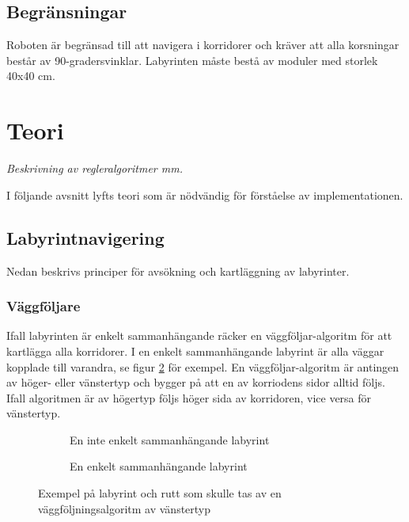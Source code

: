 \documentclass[11pt]{article}
\begin{document}
\begin{flushleft}
\subsection{Begränsningar}
Roboten är begränsad till att navigera i korridorer och kräver att alla korsningar består av 90-gradersvinklar. Labyrinten måste bestå av moduler med storlek 40x40 cm.

\pagebreak

\section{Teori}
\textit{Beskrivning av regleralgoritmer mm.}

I följande avsnitt lyfts teori som är nödvändig för förståelse av implementationen.

\subsection{Labyrintnavigering}
Nedan beskrivs principer för avsökning och kartläggning av labyrinter.

\subsubsection{Väggföljare}
Ifall labyrinten är enkelt sammanhängande räcker en väggföljar-algoritm för att kartlägga alla korridorer. I en enkelt sammanhängande labyrint är alla väggar kopplade till varandra, se figur \ref{maze} för exempel. En väggföljar-algoritm är antingen av höger- eller vänstertyp och bygger på att en av korriodens sidor alltid följs. Ifall algoritmen är av högertyp följs höger sida av korridoren, vice versa för vänstertyp.

\begin{figure}[htbp]
	\centering
	\begin{subfigure}{.5\linewidth}
		\centering
		\noindent\resizebox{.5\textwidth}{!}{
			}
		\caption{En inte enkelt sammanhängande labyrint}	
		\label{non-connected}
	\end{subfigure}%
	\begin{subfigure}{.5\linewidth}
		\centering
		\noindent\resizebox{.5\textwidth}{!}{
			}
		\caption{En enkelt sammanhängande labyrint}	
	\end{subfigure}%
	\caption{Exempel på labyrint och rutt som skulle tas av en väggföljningsalgoritm av vänstertyp}
	\label{maze}
\end{figure}%


\end{flushleft}
\end{document}
